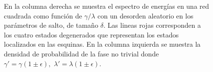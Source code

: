 \begin{figure}[h!]
\begin{minipage}[h!]{0.7\textwidth}
\begin{subfigure}[b!]{0.56 \textwidth}
         \end{subfigure}\hspace*{-0.5em}
     \end{minipage}\vspace*{-0.5em}
    \caption{En la columna derecha se muestra el espectro de energías en una red cuadrada como función de $\gamma/\lambda $ con un desorden aleatorio en los parámetros de salto, de tamaño $\delta$. Las lineas rojas corresponden a los cuatro estados degenerados que representan los estados localizados en las esquinas. En la columna izquierda se muestra la densidad de probabilidad de la fase no trivial donde $\gamma' = \gamma( 1 \pm \epsilon) ,\, \, \lambda' = \lambda( 1 \pm \epsilon)$.  }
    \label{fig:Pram_Proy_Delta_cuadrado}
\end{figure}